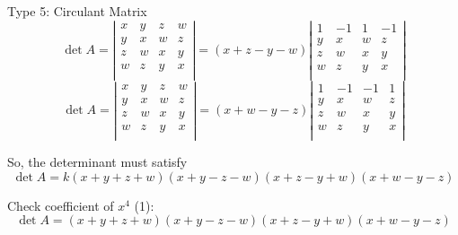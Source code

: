 \documentclass{beamer}
\begin{document}
\begin{frame}{Type 5: Circulant Matrix}
\begin{equation*}
    \det A=\left| \begin{matrix}
        x&		y&		z&		w\\
        y&		x&		w&		z\\
        z&		w&		x&		y\\
        w&		z&		y&		x\\
    \end{matrix} \right|=\left( x+z-y-w \right) \left| \begin{matrix}
        1&		-1&		1&		-1\\
        y&		x&		w&		z\\
        z&		w&		x&		y\\
        w&		z&		y&		x\\
    \end{matrix} \right|
\end{equation*}
\begin{equation*}
    \det A=\left| \begin{matrix}
        x&		y&		z&		w\\
        y&		x&		w&		z\\
        z&		w&		x&		y\\
        w&		z&		y&		x\\
    \end{matrix} \right|=\left( x+w-y-z \right) \left| \begin{matrix}
        1&		-1&		-1&		1\\
        y&		x&		w&		z\\
        z&		w&		x&		y\\
        w&		z&		y&		x\\
    \end{matrix} \right|
\end{equation*}

So, the determinant must satisfy
\begin{equation*}
    \det A=k\left( x+y+z+w \right) \left( x+y-z-w \right) \left( x+z-y+w \right) \left( x+w-y-z \right)
\end{equation*}

Check coefficient of $x^4$ (1):
\begin{equation*}
    \det A=\left( x+y+z+w \right) \left( x+y-z-w \right) \left( x+z-y+w \right) \left( x+w-y-z \right)
\end{equation*}
\end{frame}
\end{document}

